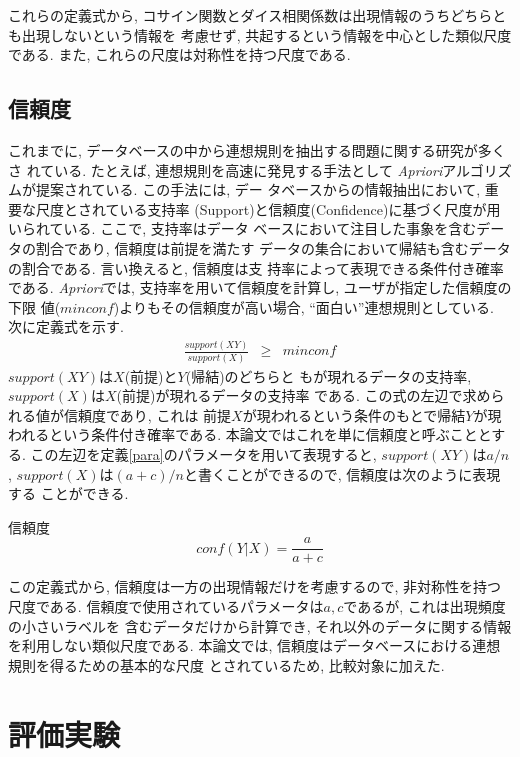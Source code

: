 これらの定義式から, コサイン関数とダイス相関係数は出現情報のうちどちらとも出現しないという情報を
考慮せず, 共起するという情報を中心とした類似尺度である. 
また, これらの尺度は対称性を持つ尺度である. 

\subsection{信頼度}
これまでに, データベースの中から連想規則を抽出する問題に関する研究が多くさ
れている\cite{Adriaans96,Dzeroski96,Fayyad96a,Fayyad96b}. 
たとえば, 連想規則を高速に発見する手法として
{\it Apriori}アルゴリズムが提案されている\cite{Agrawal96}. この手法には, デー
タベースからの情報抽出において, 重要な尺度とされている支持率
(Support)と信頼度(Confidence)に基づく尺度が用いられている.
ここで, 支持率はデータ
ベースにおいて注目した事象を含むデータの割合であり, 信頼度は前提を満たす
データの集合において帰結も含むデータの割合である. 言い換えると, 信頼度は支
持率によって表現できる条件付き確率である. 
{\it Apriori}では, 支持率を用いて信頼度を計算し, ユーザが指定した信頼度の下限
値($minconf$)よりもその信頼度が高い場合, ``面白い''連想規則としている. 
次に定義式を示す. 
\begin{eqnarray*}
\frac{support(XY)}{support(X)} &\geq& minconf
\end{eqnarray*}
$support(XY)$は$X$(前提)と$Y$(帰結)のどちらと
もが現れるデータの支持率, $support(X)$は$X$(前提)が現れるデータの支持率
である. 
この式の左辺で求められる値が信頼度であり, これは
前提$X$が現われるという条件のもとで帰結$Y$が現
われるという条件付き確率である. 
本論文ではこれを単に信頼度と呼ぶこととする. 
この左辺を定義\ref{para}のパラメータを用いて表現すると, $support(XY)$は$a/n$,
$support(X)$は$(a+c)/n$と書くことができるので, 信頼度は次のように表現する
ことができる. 
\begin{df} 信頼度
\begin{equation}
conf(Y|X) = \frac{a}{a+c}
\end{equation}
\end{df}
この定義式から, 
信頼度は一方の出現情報だけを考慮するので, 非対称性を持つ尺度である. 
信頼度で使用されているパラメータは$a,c$であるが, これは出現頻度の小さいラベルを
含むデータだけから計算でき, それ以外のデータに関する情報を利用しない類似尺度である. 
本論文では, 信頼度はデータベースにおける連想規則を得るための基本的な尺度
とされているため, 比較対象に加えた. 

\section{評価実験}
